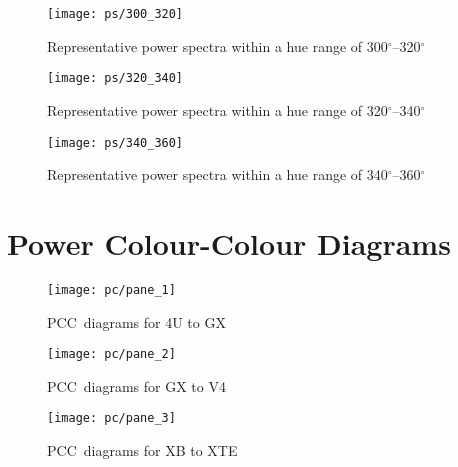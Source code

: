 \begin{figure}[p]
	{\vspace*{-0.5cm}\hspace*{-1.5cm}\texttt{[image: ps/300\_320]}}
	\caption[Power spectra with a hue of 300$^\circ$--320$^\circ$]{Representative power spectra within a hue range of 300$^\circ$--320$^\circ$}\label{fig:ps_300_320}
\end{figure}

\begin{figure}[p]
	{\vspace*{-0.5cm}\hspace*{-1.5cm}\texttt{[image: ps/320\_340]}}
	\caption[Power spectra with a hue of 320$^\circ$--340$^\circ$]{Representative power spectra within a hue range of 320$^\circ$--340$^\circ$}\label{fig:ps_320_340}
\end{figure}
\begin{figure}[p]
	{\vspace*{-0.5cm}\hspace*{-1.5cm}\texttt{[image: ps/340\_360]}}
	\caption[Power spectra with a hue of 340$^\circ$--360$^\circ$]{Representative power spectra within a hue range of 340$^\circ$--360$^\circ$}\label{fig:ps_340_360}
\end{figure}

\captionsetup[figure]{list=yes}
\chapter{Power Colour-Colour Diagrams}
\label{ch:pccds}
\begin{figure}[p]
	{\vspace*{-0cm}\hspace*{-3cm}\texttt{[image: pc/pane\_1]}}
	\caption{\acs{PCC}~diagrams for 4U to GX}\label{fig:pc_pane_1}
\end{figure}
\captionsetup[figure]{list=no}
\begin{figure}[p]
	{\vspace*{-0cm}\hspace*{-3cm}\texttt{[image: pc/pane\_2]}}
	\caption{\acs{PCC}~diagrams for GX to V4}\label{fig:pc_pane_2}
\end{figure}

\begin{figure}[p]
	{\vspace*{-0cm}\hspace*{-3cm}\texttt{[image: pc/pane\_3]}}
	\caption{\acs{PCC}~diagrams for XB to XTE}\label{fig:pc_pane_3}
\end{figure}

